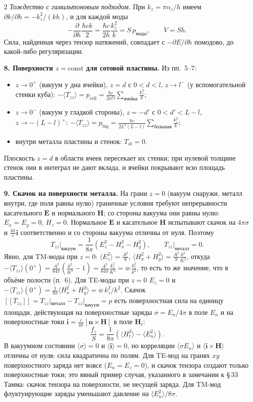 \documentclass[twoside, 10pt]{article}
\begin{document}
\begin{multicols}{2}
\textit{Тождество с гамильтоновым подходом.} При $k_z=\pi n_z/h$ имеем
$\partial k/\partial h=-k_z^2/(kh)$, и для каждой моды
\[
-\frac{\partial}{\partial h}\frac{\hbar ck}{2}=\frac{\hbar c}{2h}\frac{k_z^2}{k}=S\,p_{\text{моды}},\qquad V=Sh .
\]
Сила, найденная через тензор натяжений, совпадает с $-\partial E/\partial h$
помодово, до какой-либо регуляризации.

\textbf{8. Поверхности $z=\mathrm{const}$ для сотовой пластины.} Из пп.~5--7:
\begin{itemize}
\item $z\to0^+$ (вакуум у дна ячейки), $z=d$ с $0<d<l$, $z\to l^-$ (у вспомогательной
стенки куба): $-\langle T_{zz}\rangle=p_{\text{cell}}=\frac{\hbar c}{2a^2l}\sum_{\text{ячейка}}\frac{k_z^2}{k}$;
\item $z\to0^-$ (вакуум у гладкой стороны), $z=-d'$ с $0<d'<L-l$, $z\to-(L-l)^+$:
$-\langle T_{zz}\rangle=p_{\text{big}}=\frac{\hbar c}{2L^2(L-l)}\sum_{\text{большая}}\frac{k_z^2}{k}$;
\item внутри металла пластины и стенок: $T_{ik}=0$.
\end{itemize}
Плоскость $z=d$ в области ячеек пересекает их стенки; при нулевой толщине стенок
они в интеграл не дают вклада, и ячейки покрывают всю площадь пластины.

\textbf{9. Скачок на поверхности металла.} На грани $z=0$ (вакуум снаружи, металл
внутри, где поля равны нулю) граничные условия требуют непрерывности
касательного $\mathbf E$ и нормального $\mathbf H$; со стороны вакуума они равны
нулю: $E_x=E_y=0$, $H_z=0$. Нормальное $\mathbf E$ и касательное $\mathbf H$
испытывают скачок на $4\pi\sigma$ и $\frac{4\pi}{c}\mathbf i$ соответственно и со
стороны вакуума отличны от нуля. Поэтому
\[
T_{zz}\big|_{\text{вакуум}}=\frac1{8\pi}\left(E_z^2-H_x^2-H_y^2\right),\qquad
T_{zz}\big|_{\text{металл}}=0 .
\]
Явно, для TM-моды при $z=0$: $\langle E_z^2\rangle=\frac{A^2}{8}$,
$\langle H_x^2+H_y^2\rangle=\frac{A^2}{8}\frac{k^2}{K^2}$, откуда
$-\langle T_{zz}\rangle(0^+)=\frac{A^2}{64\pi}\left(\frac{k^2}{K^2}-1\right)=\frac{A^2}{64\pi}\frac{k_z^2}{K^2}=\overline w\,\frac{k_z^2}{k^2}$,
то есть то же значение, что в объёме полости (п.~6). Для TE-моды при $z=0$
$E_z=0$ и $-\langle T_{zz}\rangle(0^+)=\frac{1}{8\pi}\langle H_x^2+H_y^2\rangle=\overline w\,k_z^2/k^2$.
Скачок $[\![T_{zz}]\!]=T_{zz}|_{\text{металл}}-T_{zz}|_{\text{вакуум}}=p$ есть
поверхностная сила на единицу площади, действующая на поверхностные заряды
$\sigma=E_n/4\pi$ в поле $E_n$ и на поверхностные токи
$\mathbf i=\frac{c}{4\pi}[\mathbf n\times\mathbf H]$ в поле $\mathbf H_t$:
\[
\frac{f_z}{S}=\frac1{8\pi}\left(\langle H_t^2\rangle-\langle E_n^2\rangle\right).
\]
В вакуумном состоянии $\langle\sigma\rangle=0$ и $\langle\mathbf i\rangle=0$, но
корреляции $\langle\sigma E_n\rangle$ и $\langle\mathbf i\times\mathbf H\rangle$ отличны от
нуля: сила квадратична по полям. Для TE-мод на гранях $xy$ поверхностного заряда
нет вовсе ($E_n=E_z=0$), и скачок тензора создают только поверхностные токи; это
явный пример случая, указанного в замечании к \S\,33 Тамма: скачок тензора на
поверхности, не несущей заряда. Для TM-мод флуктуирующие заряды уменьшают давление
на $\langle E_n^2\rangle/8\pi$.


\end{multicols}
\end{document}

